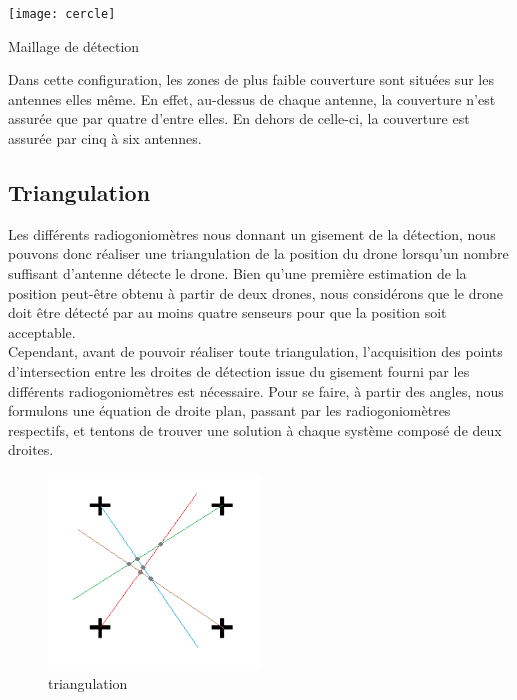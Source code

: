 \begin{minipage}{0.45\linewidth}
  \centering
  \texttt{[image: cercle]}
  \caption{Maillage de détection}
\end{minipage}
\begin{minipage}{0.45\linewidth}
  Dans cette configuration, les zones de plus faible couverture
sont situées sur les antennes elles même. En effet, au-dessus
de chaque antenne, la couverture n’est assurée que par
quatre d’entre elles. En dehors de celle-ci, la couverture est
assurée par cinq à six antennes.
\end{minipage}


\subsection{Triangulation}

Les différents radiogoniomètres nous donnant un gisement de la détection, nous pouvons donc
réaliser une triangulation de la position du drone lorsqu’un nombre suffisant d’antenne détecte le
drone. Bien qu’une première estimation de la position peut-être obtenu à partir de deux drones,
nous considérons que le drone doit être détecté par au moins quatre senseurs pour que la position
soit acceptable.
~\\

Cependant, avant de pouvoir réaliser toute triangulation, l’acquisition des points d’intersection entre
les droites de détection issue du gisement fourni par les différents radiogoniomètres est nécessaire.
Pour se faire, à partir des angles, nous formulons une équation de droite plan, passant par les
radiogoniomètres respectifs, et tentons de trouver une solution à chaque système composé de deux
droites.
~\\

\begin{figure}

  \includegraphics[width=0.5\textwidth]{triangulation1}
  \caption{triangulation}
\end{figure}

